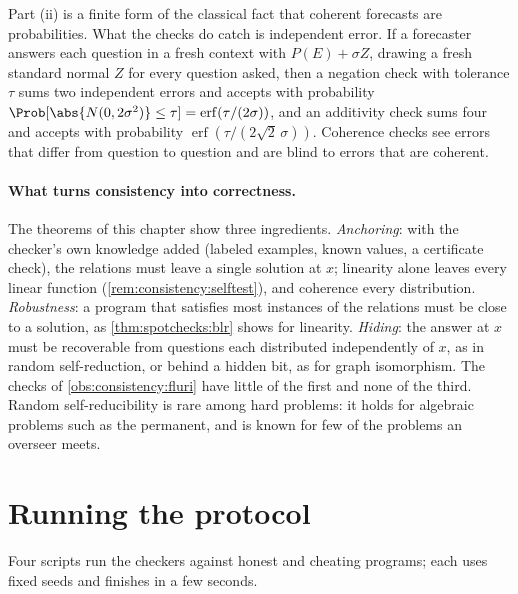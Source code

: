 \begin{refsection}
Part (ii) is a finite form of the classical fact that coherent forecasts are probabilities. What the checks do catch is independent error. If a forecaster answers each question in a fresh context with $P(E)+\sigma Z$, drawing a fresh standard normal $Z$ for every question asked, then a negation check with tolerance $\tau$ sums two independent errors and accepts with probability $\Prob[\abs{N(0,2\sigma^2)}\le\tau]=\operatorname{erf}(\tau/(2\sigma))$, and an additivity check sums four and accepts with probability $\operatorname{erf}(\tau/(2\sqrt2\,\sigma))$. Coherence checks see errors that differ from question to question and are blind to errors that are coherent.

\paragraph{What turns consistency into correctness.} The theorems of this chapter show three ingredients. \emph{Anchoring}: with the checker's own knowledge added (labeled examples, known values, a certificate check), the relations must leave a single solution at $x$; linearity alone leaves every linear function (\cref{rem:consistency:selftest}), and coherence every distribution. \emph{Robustness}: a program that satisfies most instances of the relations must be close to a solution, as \cref{thm:spotchecks:blr} shows for linearity. \emph{Hiding}: the answer at $x$ must be recoverable from questions each distributed independently of $x$, as in random self-reduction, or behind a hidden bit, as for graph isomorphism. The checks of \cref{obs:consistency:fluri} have little of the first and none of the third. Random self-reducibility is rare among hard problems: it holds for algebraic problems such as the permanent, and is known for few of the problems an overseer meets.

\section{Running the protocol}\label{sec:consistency:running}

Four scripts run the checkers against honest and cheating programs; each uses fixed seeds and finishes in a few seconds.


\end{refsection}
